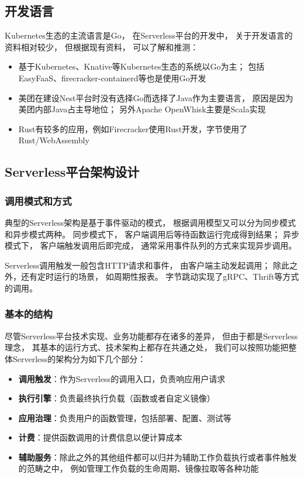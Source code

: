 \subsection{开发语言}
Kubernetes生态的主流语言是Go，
在Serverless平台的开发中，
关于开发语言的资料相对较少，
但根据现有资料，
可以了解和推测：

\begin{itemize}
    \item 基于Kubernetes、Knative等Kubernetes生态的系统以Go为主；
    包括EasyFaaS、firecracker-containerd等也是使用Go开发
    \item 美团在建设Nest平台时没有选择Go而选择了Java作为主要语言，
    原因是因为美团内部Java占主导地位\cite{meituan_serverless_nest}；
    另外Apache OpenWhisk主要是Scala实现
    \item Rust有较多的应用，例如Firecracker使用Rust开发，字节使用了Rust/WebAssembly\cite{bytedance_faas}
\end{itemize}


\subsection{Serverless平台架构设计}
\subsubsection{调用模式和方式}
典型的Serverless架构是基于事件驱动的模式，
根据调用模型又可以分为同步模式和异步模式两种。
同步模式下，
客户端调用后等待函数运行完成得到结果；
异步模式下，
客户端触发调用后即完成，
通常采用事件队列的方式来实现异步调用\cite{aws_lambda_2022}。

Serverless调用触发一般包含HTTP请求和事件，
由客户端主动发起调用；
除此之外，还有定时运行的场景，
如周期性报表\cite{meituan_serverless_nest}。
字节跳动实现了gRPC、Thrift等方式的调用\cite{bytedance_faas}。

\subsubsection{基本的结构}
尽管Serverless平台技术实现、业务功能都存在诸多的差异，
但由于都是Serverless理念，
其基本的运行方式、技术架构上都存在共通之处，
我们可以按照功能把整体Serverless的架构分为如下几个部分：

\begin{itemize}
    \item \textbf{调用触发}：作为Serverless的调用入口，负责响应用户请求
    \item \textbf{执行引擎}：负责最终执行负载（函数或者自定义镜像）
    \item \textbf{应用治理}：负责用户的函数管理，包括部署、配置、测试等
    \item \textbf{计费}：提供函数调用的计费信息以便计算成本
    \item \textbf{辅助服务}：除此之外的其他组件都可以归并为辅助工作负载执行或者事件触发的范畴之中，
    例如管理工作负载的生命周期、镜像拉取等各种功能
\end{itemize}

